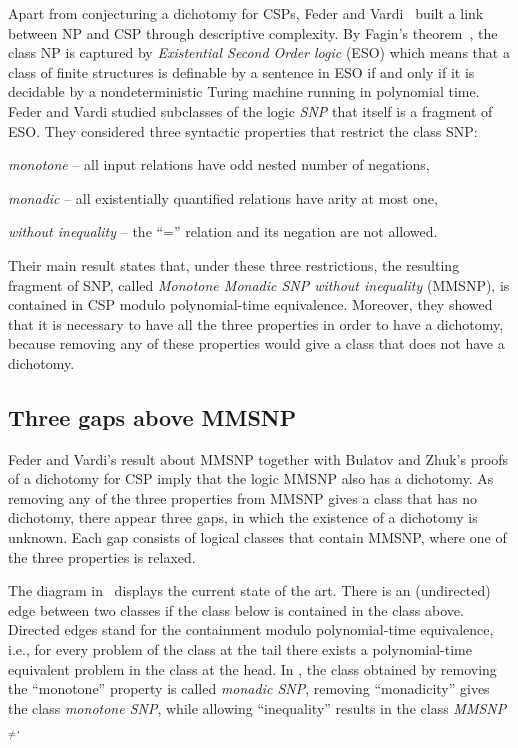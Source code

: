 \documentclass[10pt,a4paper]{amsart}
\theoremstyle{plain}
\theoremstyle{definition}
\numberwithin{equation}{section}
\begin{document}
Apart from conjecturing a dichotomy for CSPs, Feder and Vardi~\cite{federvardi1998} built a link between NP and CSP through descriptive complexity.
%
By Fagin's theorem~\cite{fagin1974}, the class NP is captured by \emph{Existential Second Order logic} (ESO) which means that a class of finite structures is definable by a sentence in ESO if and only if it is decidable by a nondeterministic Turing machine running in polynomial time.
%
Feder and Vardi studied subclasses of the logic \emph{SNP} that itself is a fragment of ESO.
%
They considered three syntactic properties that restrict the class SNP:
\begin{compactitem}
\item \emph{monotone} -- all input relations have odd nested number of negations,
\item \emph{monadic} -- all existentially quantified relations have arity at most one,
\item \emph{without inequality} -- the ``='' relation and its negation are not allowed.
\end{compactitem}
%
Their main result states that, under these three restrictions, the resulting fragment of SNP, called \emph{Monotone Monadic SNP without inequality} (MMSNP), is contained in CSP modulo polynomial-time equivalence.
%
Moreover, they showed that it is necessary to have all the three properties in order to have a dichotomy, because removing any of these properties would give a class that does not have a dichotomy.


\subsection{Three gaps above MMSNP}
Feder and Vardi's result about MMSNP together with Bulatov and Zhuk's proofs of a dichotomy for CSP imply that the logic MMSNP also has a dichotomy.
%
As removing any of the three properties from MMSNP gives a class that has no dichotomy, there appear three gaps, in which the existence of a dichotomy is unknown.
%
Each gap consists of logical classes that contain MMSNP, where one of the three properties is relaxed.

The diagram in~ displays the current state of the art.
%
There is an (undirected) edge between two classes if the class below is contained in the class above.
%
Directed edges stand for the containment modulo polynomial-time equivalence, i.e., for every problem of the class at the tail there exists a polynomial-time equivalent problem in the class at the head.
%
In , the class obtained by removing the ``monotone'' property is called \emph{monadic SNP}, removing ``monadicity'' gives the class \emph{monotone SNP}, while allowing ``inequality'' results in the class \emph{MMSNP$_{\not=}$}.
\end{document}
